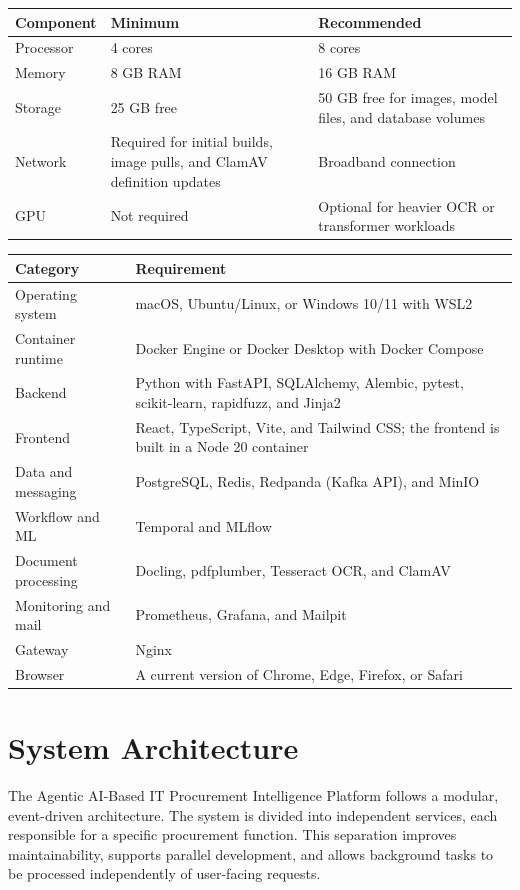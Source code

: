 \documentclass[12pt,a4paper]{report}
\begin{document}
\begin{longtable}{|p{1.5in}|p{2in}|p{2.5in}|}
\hline
\textbf{Component} & \textbf{Minimum} & \textbf{Recommended} \\
\hline
Processor & 4 cores & 8 cores \\
\hline
Memory & 8 GB RAM & 16 GB RAM \\
\hline
Storage & 25 GB free & 50 GB free for images, model files, and
database volumes \\
\hline
Network & Required for initial builds, image pulls, and ClamAV
definition updates & Broadband connection \\
\hline
GPU & Not required & Optional for heavier OCR or transformer workloads \\
\hline
\end{longtable}

\begin{longtable}{|p{1.7in}|p{4.3in}|}
\hline
\textbf{Category} & \textbf{Requirement} \\
\hline
Operating system & macOS, Ubuntu/Linux, or Windows 10/11 with WSL2 \\
\hline
Container runtime & Docker Engine or Docker Desktop with Docker Compose \\
\hline
Backend & Python with FastAPI, SQLAlchemy, Alembic, pytest,
scikit-learn, rapidfuzz, and Jinja2 \\
\hline
Frontend & React, TypeScript, Vite, and Tailwind CSS; the frontend is
built in a Node 20 container \\
\hline
Data and messaging & PostgreSQL, Redis, Redpanda (Kafka API), and MinIO \\
\hline
Workflow and ML & Temporal and MLflow \\
\hline
Document processing & Docling, pdfplumber, Tesseract OCR, and ClamAV \\
\hline
Monitoring and mail & Prometheus, Grafana, and Mailpit \\
\hline
Gateway & Nginx \\
\hline
Browser & A current version of Chrome, Edge, Firefox, or Safari \\
\hline
\end{longtable}
\section{System Architecture}

The Agentic AI-Based IT Procurement Intelligence Platform follows a
modular, event-driven architecture. The system is divided into
independent services, each responsible for a specific procurement
function. This separation improves maintainability, supports parallel
development, and allows background tasks to be processed independently
of user-facing requests.
\end{document}
